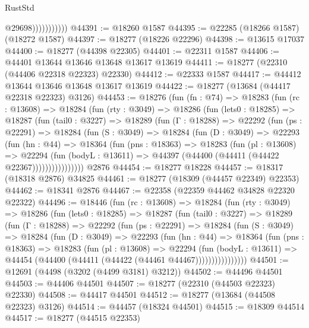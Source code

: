 \begin{lexlean}{RustStd}
\begin{coremodule}
                          @29698)))))))))))
@44391 := @18260 @1587
@44395 := @22285 (@18266 @1587) (@18272 @1587)
@44397 := @18277 (@18226 @22296)
@44398 := @13615 @17037
@44400 := @18277 (@44398 @22305)
@44401 := @22311 @1587
@44406 := @44401 @13644 @13646 @13648 @13617 @13619
@44411 := @18277 (@22310 (@44406 @22318 @22323) @22330)
@44412 := @22333 @1587
@44417 := @44412 @13644 @13646 @13648 @13617 @13619
@44422 := @18277 (@13684 (@44417 @22318 @22323) @3126)
@44453 := @18276
    (fun (fn : @74) =>
    @18283
      (fun (rc : @13608) =>
      @18284
        (fun (rty : @3049) =>
        @18286
          (fun (lets0 : @18285) =>
          @18287
            (fun (tail0 : @3227) =>
            @18289
              (fun (Γ : @18288) =>
              @22292
                (fun (ps : @22291) =>
                @18284
                  (fun (S : @3049) =>
                  @18284
                    (fun (D : @3049) =>
                    @22293
                      (fun (hn : @44) =>
                      @18364
                        (fun (pns : @18363) =>
                        @18283
                          (fun (pl : @13608) =>
                          @22294
                            (fun (bodyL : @13611) =>
                            @44397 (@44400 (@44411 (@44422 @22367))))))))))))))))
    @2876
@44454 := @18277 @18228
@44457 := @18317 (@18318 @2876) @34825
@44461 := @18277 (@18309 (@44457 @22349) @22353)
@44462 := @18341 @2876
@44467 := @22358 (@22359 @44462 @34828 @22320 @22322)
@44496 := @18446
    (fun (rc : @13608) =>
    @18284
      (fun (rty : @3049) =>
      @18286
        (fun (lets0 : @18285) =>
        @18287
          (fun (tail0 : @3227) =>
          @18289
            (fun (Γ : @18288) =>
            @22292
              (fun (ps : @22291) =>
              @18284
                (fun (S : @3049) =>
                @18284
                  (fun (D : @3049) =>
                  @22293
                    (fun (hn : @44) =>
                    @18364
                      (fun (pns : @18363) =>
                      @18283
                        (fun (pl : @13608) =>
                        @22294
                          (fun (bodyL : @13611) =>
                          @44454 (@44400 (@44411 (@44422 (@44461 @44467))))))))))))))))
@44501 := @12691 (@4498 (@3202 (@4499 @3181) @3212))
@44502 := @44496 @44501
@44503 := @44406 @44501
@44507 := @18277 (@22310 (@44503 @22323) @22330)
@44508 := @44417 @44501
@44512 := @18277 (@13684 (@44508 @22323) @3126)
@44514 := @44457 (@18324 @44501)
@44515 := @18309 @44514
@44517 := @18277 (@44515 @22353)

\end{coremodule}
\end{lexlean}
